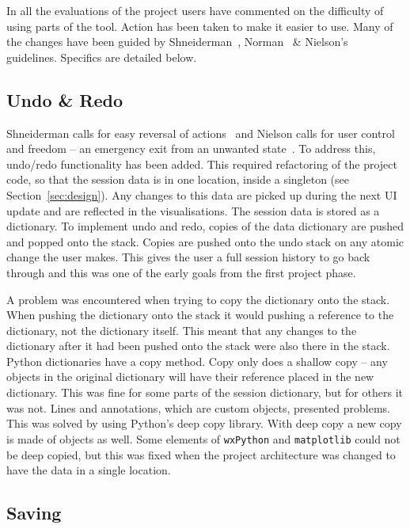 In all the evaluations of the project users have commented on the difficulty of using parts of the tool.  Action has been taken to make it easier to use.  Many of the changes have been guided by Shneiderman~\cite{shgold}, Norman~\cite{normsev} \& Nielson's~\cite{neilten} guidelines.  Specifics are detailed below.

\subsection{Undo \& Redo}
\label{sec:undo}
Shneiderman calls for easy reversal of actions~\cite{shgold} and Nielson calls for user control and freedom -- an emergency exit from an unwanted state~\cite{neilten}.  To address this, undo/redo functionality has been added.  This required refactoring of the project code, so that the session data is in one location, inside a singleton (see Section~\ref{sec:design}). Any changes to this data are picked up during the next \ac{UI} update and are reflected in the visualisations.  The session data is stored as a dictionary.  To implement undo and redo, copies of the data dictionary are pushed and popped onto the stack.  Copies are pushed onto the undo stack on any atomic change the user makes.  This gives the user a full session history to go back through and this was one of the early goals from the first project phase.

A problem was encountered when trying to copy the dictionary onto the stack.  When pushing the dictionary onto the stack it would pushing a reference to the dictionary, not the dictionary itself. This meant that any changes to the dictionary after it had been pushed onto the stack were also there in the stack.  Python dictionaries have a copy method.  Copy only does a shallow copy -- any objects in the original dictionary will have their reference placed in the new dictionary.  This was fine for some parts of the session dictionary, but for others it was not. Lines and annotations, which are custom objects, presented problems.  This was solved by using Python's deep copy library.  With deep copy a new copy is made of objects as well.  Some elements of \texttt{wxPython} and \texttt{matplotlib} could not be deep copied, but this was fixed when the project architecture was changed to have the data in a single location.

\subsection{Saving}

